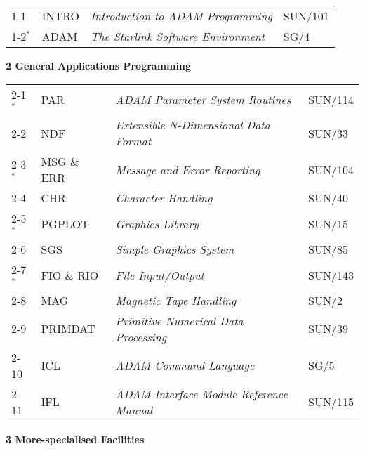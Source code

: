 \documentclass[twoside,11pt]{article}
\newcommand{\latex}[1]{#1}
\newcommand{\xref}[3]{#1}
\newcommand{\changed}{\bf $^*$}
\begin{document}
\begin{tabular}{p{8mm}p{27mm}p{90mm}l}
1-1 & INTRO & {\em Introduction to ADAM Programming} & \xref{SUN/101}{sun101}{}\\
1-2\changed & ADAM & {\em The Starlink Software Environment} & \xref{SG/4}{sg4}{}\\
\end{tabular}

\latex{\vspace{2ex}}
{\Large \bf 2 General Applications Programming}

\begin{tabular}{p{8mm}p{27mm}p{90mm}l}
2-1\changed & PAR & {\em ADAM Parameter System Routines} & \xref{SUN/114}{sun114}{}\\
2-2 & NDF & {\em Extensible N-Dimensional Data Format} & \xref{SUN/33}{sun33}{}\\
2-3\changed & MSG \& ERR & {\em Message and Error Reporting} & \xref{SUN/104}{sun104}{}\\
2-4 & CHR & {\em Character Handling} & \xref{SUN/40}{sun40}{}\\
2-5\changed & PGPLOT & {\em Graphics Library} & \xref{SUN/15}{sun15}{}\\
2-6 & SGS & {\em Simple Graphics System} & \xref{SUN/85}{sun85}{}\\
2-7\changed & FIO \& RIO & {\em File Input/Output} & \xref{SUN/143}{sun143}{}\\
2-8 & MAG & {\em Magnetic Tape Handling} & \xref{SUN/2}{sun2}{}\\
2-9 & PRIMDAT & {\em Primitive Numerical Data Processing} & \xref{SUN/39}{sun39}{}\\
2-10 & ICL & {\em ADAM Command Language} & \xref{SG/5}{sg5}{}\\
2-11 & IFL & {\em ADAM Interface Module Reference Manual} & \xref{SUN/115}{sun115}{}\\
\end{tabular}

\latex{\newpage}
\latex{\vspace{2ex}}
{\Large \bf 3 More-specialised Facilities}
\end{document}
